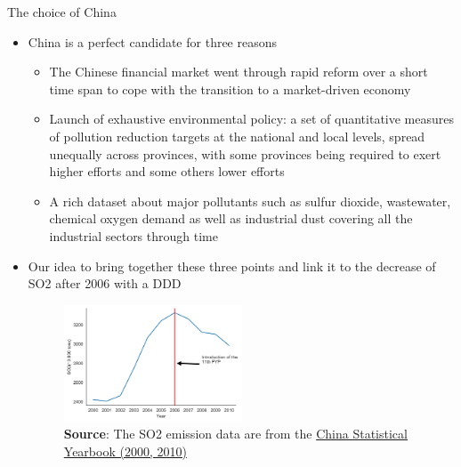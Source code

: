 \documentclass{beamer}
\begin{document}
\begin{framefont}{\small}{\scriptsize}{\scriptsize}
    \begin{frame}{The choice of China}
    \begin{itemize}
        \item China is a perfect candidate for three reasons
            \begin{itemize}
                \item  The Chinese financial market went through rapid reform over a short time span to cope with the transition to a market-driven economy
                \item Launch of exhaustive environmental policy: a set of quantitative measures of pollution reduction targets at the national and local levels, spread unequally across provinces, with some provinces being required to exert higher efforts and some others lower efforts
                \item A rich dataset about major pollutants such as sulfur dioxide, wastewater, chemical oxygen demand as well as industrial dust covering all the industrial sectors through time
            \end{itemize}
         \item Our idea to bring together these three points and link it to the decrease of SO2 after 2006 with a DDD
        \begin{figure}[ht]
            \centering
            \includegraphics[width=0.5\textwidth]{fig_1}\\
            \tiny \textbf{Source}: The SO2 emission data are from the \href{http://www.stats.gov.cn/english/Statisticaldata/AnnualData/}{China Statistical Yearbook (2000, 2010)}
        \end{figure}
    \end{itemize}
    \end{frame}
\end{framefont}
\end{document}

